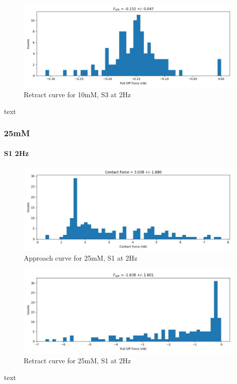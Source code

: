 \begin{figure}[h!]
\centering
\includegraphics[width=\textwidth]{chapter7/Tip speed/10mM/S3 2Hz/retract_f_a_hist.jpg}
\caption{Retract curve for 10mM, S3 at 2Hz}
\end{figure}
text
\newpage

\subsubsection*{25mM}
\paragraph{S1 2Hz}
\begin{figure}[h!]
\centering
\includegraphics[width=\textwidth]{chapter7/Tip speed/25mM/S1 2Hz/approach_f_c_hist.jpg}
\caption{Approach curve for 25mM, S1 at 2Hz}
\end{figure}

\begin{figure}[h!]
\centering
\includegraphics[width=\textwidth]{chapter7/Tip speed/25mM/S1 2Hz/retract_f_a_hist.jpg}
\caption{Retract curve for 25mM, S1 at 2Hz}
\end{figure}
text
\newpage

